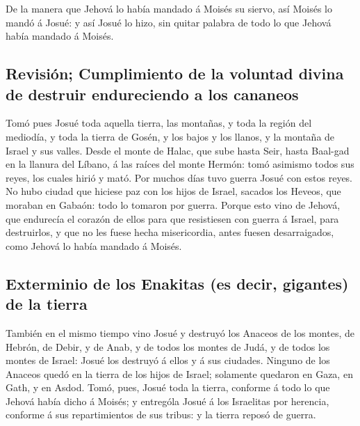  De la manera que Jehová lo había mandado á Moisés su
siervo, así Moisés lo mandó á Josué: y así Josué lo hizo, sin quitar
palabra de todo lo que Jehová había mandado á Moisés.

\hypertarget{revisiuxf3n-cumplimiento-de-la-voluntad-divina-de-destruir-endureciendo-a-los-cananeos}{%
\subsection{Revisión; Cumplimiento de la voluntad divina de destruir
endureciendo a los
cananeos}\label{revisiuxf3n-cumplimiento-de-la-voluntad-divina-de-destruir-endureciendo-a-los-cananeos}}

 Tomó pues Josué toda aquella tierra, las montañas, y
toda la región del mediodía, y toda la tierra de Gosén, y los bajos y
los llanos, y la montaña de Israel y sus valles.  Desde
el monte de Halac, que sube hasta Seir, hasta Baal-gad en la llanura del
Líbano, á las raíces del monte Hermón: tomó asimismo todos sus reyes,
los cuales hirió y mató.  Por muchos días tuvo guerra
Josué con estos reyes.  No hubo ciudad que hiciese paz
con los hijos de Israel, sacados los Heveos, que moraban en Gabaón: todo
lo tomaron por guerra.  Porque esto vino de Jehová, que
endurecía el corazón de ellos para que resistiesen con guerra á Israel,
para destruirlos, y que no les fuese hecha misericordia, antes fuesen
desarraigados, como Jehová lo había mandado á Moisés.

\hypertarget{exterminio-de-los-enakitas-es-decir-gigantes-de-la-tierra}{%
\subsection{Exterminio de los Enakitas (es decir, gigantes) de la
tierra}\label{exterminio-de-los-enakitas-es-decir-gigantes-de-la-tierra}}

 También en el mismo tiempo vino Josué y destruyó los
Anaceos de los montes, de Hebrón, de Debir, y de Anab, y de todos los
montes de Judá, y de todos los montes de Israel: Josué los destruyó á
ellos y á sus ciudades.  Ninguno de los Anaceos quedó en
la tierra de los hijos de Israel; solamente quedaron en Gaza, en Gath, y
en Asdod.  Tomó, pues, Josué toda la tierra, conforme á
todo lo que Jehová había dicho á Moisés; y entrególa Josué á los
Israelitas por herencia, conforme á sus repartimientos de sus tribus: y
la tierra reposó de guerra.

